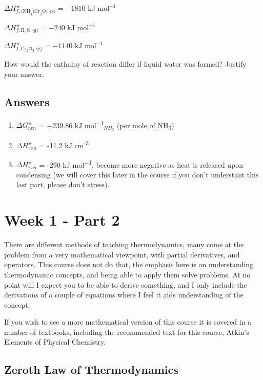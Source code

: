 \documentclass[
]{book}
\providecommand{\tightlist}{%
  \setlength{\itemsep}{0pt}\setlength{\parskip}{0pt}}
\begin{document}
\(ΔH^⦵_{f, \textrm{(NH}_4\textrm{)Cr}_2\textrm{O}_7\textrm{ (s)}} = −1810 \textrm{ kJ mol}^{−1}\)

\(ΔH^⦵_{f, \textrm{H}_2 \textrm{O (g)}} = −240 \textrm{ kJ mol}^{−1}\)

\(ΔH^⦵_{f, \textrm{Cr}_2 \textrm{O}_3 \textrm{ (g)}} = −1140 \textrm{ kJ mol}^{−1}\)

How would the enthalpy of reaction differ if liquid water was formed? Justify your answer.

\hypertarget{sec:Answers1}{%
\section{Answers}\label{sec:Answers1}}

\begin{enumerate}
\def\labelenumi{\arabic{enumi}.}
\tightlist
\item
  \(ΔG_{rxn}^⦵\) = −239.86 kJ mol\textsuperscript{−1}\(_{NH_3}\) (per mole of NH\textsubscript{3})
\item
  \(ΔH_{rxn}^⦵\) = -11.2 kJ cm\textsuperscript{-3}
\item
  \(ΔH_{rxn}^⦵\) = -290 kJ mol\textsuperscript{−1}, become more negative as heat is released upon condensing (we will cover this later in the course if you don't understant this last part, please don't stress).
\end{enumerate}

\hypertarget{ch:Part2}{%
\chapter{Week 1 - Part 2}\label{ch:Part2}}

There are different methods of teaching thermodynamics, many come at the problem from a very mathematical viewpoint, with partial derivatives, and operators. This course does not do that, the emphasis here is on understanding thermodynamic concepts, and being able to apply them solve problems. At no point will I expect you to be able to derive something, and I only include the derivations of a couple of equations where I feel it aids understanding of the concept.

If you wish to see a more mathematical version of this course it is covered in a number of textbooks, including the recommended text for this course, Atkin's Elements of Physical Chemistry.

\hypertarget{zeroth-law-of-thermodynamics}{%
\section{Zeroth Law of Thermodynamics}\label{zeroth-law-of-thermodynamics}}
\end{document}
